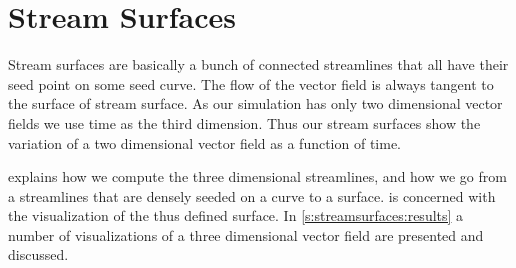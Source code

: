 \chapter{Stream Surfaces} %
\label{cha:stream_surfaces}

Stream surfaces are basically a bunch of connected streamlines that all have their seed point on some seed curve. The flow of the vector field is always tangent to the surface of stream surface. As our simulation has only two dimensional vector fields we use time as the third dimension. Thus our stream surfaces show the variation of a two dimensional vector field as a function of time. 

 explains how we compute the three dimensional streamlines, and how we go from a streamlines that are densely seeded on a curve to a surface.  is concerned with the visualization of the thus defined surface. In \cref{s:streamsurfaces:results} a number of visualizations of a three dimensional vector field are presented and discussed.







